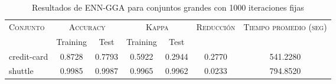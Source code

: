 \begin{table}[]
\centering
\begin{tabular}{l c c c c c c}
\hline
\multirow{2}{*}{\textsc{Conjunto}}
	& \multicolumn{2}{c}{\textsc{Accuracy}}
	& \multicolumn{2}{c}{\textsc{Kappa}}
	& \textsc{Reducción}
	& \textsc{Tiempo promedio (seg)} \\
	& Training & Test
	& Training & Test \\ 
\hline
\hline

credit-card & 0.8728 & 0.7793 & 0.5922 & 0.2944 & 0.2770 & 541.2280 \\
shuttle & 0.9985 & 0.9987 & 0.9965 & 0.9962 & 0.0233 & 794.8520 \\

\hline
\end{tabular}
\caption{Resultados de ENN-GGA para conjuntos grandes con 1000 iteraciones fijas}
\label{res-grande-enn-gga}
\end{table}

